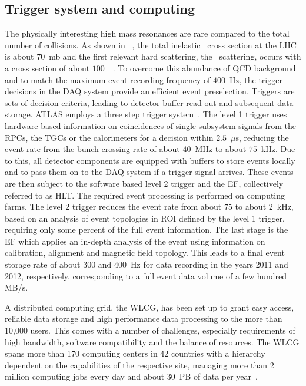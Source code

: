 \subsection{Trigger system and computing}
The physically interesting high mass resonances are rare compared to the total number of collisions. As shown in \fig~, the total inelastic \pp\ cross section at the \gls{LHC} is about $70$~mb and the first relevant hard scattering, the \Wboson\ scattering, occurs with a cross section of about $100$~\nb~\cite{Dittmaier:2012nh}. To overcome this abundance of \gls{QCD} background and to match the maximum event recording frequency of $400$~Hz, the trigger decisions in the \gls{DAQ} system provide an efficient event preselection. Triggers are sets of decision criteria, leading to detector buffer read out and subsequent data storage. \gls{ATLAS} employs a three step trigger system~\cite{ATLASCSC}. 
%
The level 1 trigger uses hardware based information on coincidences of single subsystem signals from the \glspl{RPC}, the \glspl{TGC} or the calorimeters for a decision within $2.5$~$\mu$s, reducing the event rate from the bunch crossing rate of about $40$~MHz to about $75$~kHz. Due to this, all detector components are equipped with buffers to store events locally and to pass them on to the  \gls{DAQ} system if a trigger signal arrives. 
%
These events are then subject to the software based level 2 trigger and the \gls{EF}, collectively referred to as \gls{HLT}. The required event processing is performed on computing farms. 
%
The level 2 trigger reduces the event rate from about $75$ to about $2$~kHz, based on an analysis of event topologies in \gls{ROI} defined by the level 1 trigger, requiring only some percent of the full event information.
%
The last stage is the \gls{EF} which applies an in-depth analysis of the event using information on calibration, alignment and magnetic field topology. This leads to a final event storage rate of about $300$ and $400$~Hz for data recording in the years 2011 and 2012, respectively, corresponding to a full event data volume of a few hundred MB/s.


A distributed computing grid, the \gls{WLCG}, has been set up to grant easy access, reliable data storage and high performance data processing to the more than 10,000 users. This comes with a number of challenges, especially requirements of high bandwidth, software compatibility and the balance of resources. The \gls{WLCG} spans more than 170 computing centers in 42 countries with a hierarchy dependent on the capabilities of the respective site, managing more than 2 million computing jobs every day and about 30~PB of data per year~\cite{WLCGwebsite}.

























